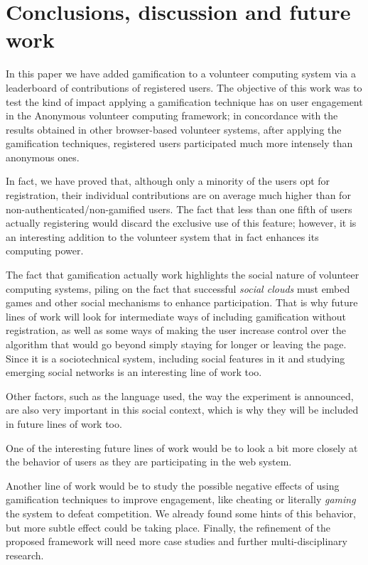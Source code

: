 \documentclass{llncs}
\begin{document}
\section{Conclusions, discussion and future work}

In this paper we have added gamification to a volunteer computing
system via a leaderboard of contributions of registered users. The objective of this work was to test the kind of impact
applying a gamification technique has on user engagement in
the Anonymous
volunteer computing framework; in concordance with
the results obtained in other
browser-based volunteer systems, after
applying the gamification techniques, registered users participated much more intensely than anonymous ones. 

In fact, we have proved that, although only a minority of the users opt
for registration, their individual contributions are on average much
higher than for non-authenticated/non-gamified users. The fact that less
than one fifth of users actually registering would discard the
exclusive use of this feature; however, it is an interesting addition
to the volunteer system that in fact enhances its computing power.

The fact that gamification actually work highlights the social nature of volunteer computing systems, piling on the fact that successful {\em social clouds} must embed games and other social mechanisms to enhance participation. That is why future lines of work will look for intermediate ways of including
gamification without registration, as well as some ways of making the
user increase control over the algorithm that would go beyond simply
staying for longer or leaving the page. Since it is a sociotechnical
system, including social features in it and studying emerging social
networks is an interesting line of work too.

Other factors, such as the language used, the way the experiment is announced, are also very important in this social context, which is why they will be included in future lines of work too.

One of the interesting future lines of work would be to look a bit
more closely at the behavior of users as they are participating
in the web system.

Another line of work would be to study the possible negative effects of using
gamification techniques to improve engagement, like cheating or
literally {\em gaming} the system to defeat competition. We already
found some hints of this behavior, but more subtle effect could be taking place.
Finally, the refinement of the proposed framework will need
more case studies and further multi-disciplinary research.
\end{document}
